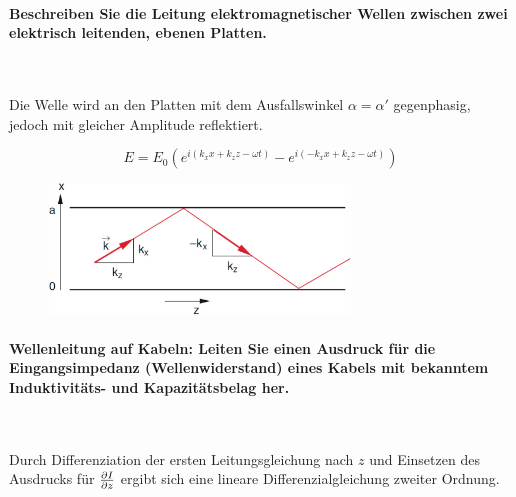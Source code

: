 \documentclass[a4paper, 11pt, parskip=half]{scrartcl}
\begin{document}
\paragraph{Beschreiben Sie die Leitung elektromagnetischer Wellen zwischen zwei elektrisch
leitenden, ebenen Platten.} ~

Die Welle wird an den Platten mit dem Ausfallswinkel $\alpha = \alpha'$ gegenphasig, jedoch mit
gleicher Amplitude reflektiert.

\begin{equation}
    E = E_0(e^{i(k_x x + k_z z - \omega t)} - e^{i(-k_x x + k_z z - \omega t)})
\end{equation}

\begin{figure}[H]
    \centering
    \includegraphics[width=8cm]{image/14/1}
\end{figure}

\paragraph{Wellenleitung auf Kabeln: Leiten Sie einen Ausdruck für die Eingangsimpedanz
(Wellenwiderstand) eines Kabels mit bekanntem Induktivitäts- und Kapazitätsbelag her.} ~

Durch Differenziation der ersten Leitungsgleichung nach $z$ und Einsetzen des Ausdrucks für
$\pdv{I}{z}$ ergibt sich eine lineare Differenzialgleichung zweiter Ordnung.
\end{document}
